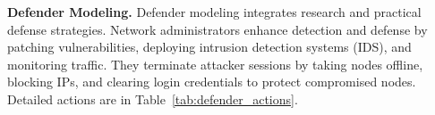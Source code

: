 
\textbf{Defender Modeling.}
Defender modeling integrates research and practical defense strategies.
Network administrators enhance detection and defense by patching vulnerabilities, deploying intrusion detection systems (IDS), and monitoring traffic. They terminate attacker sessions by taking nodes offline, blocking IPs, and clearing login credentials to protect compromised nodes. Detailed actions are in Table~\ref{tab:defender_actions}.



